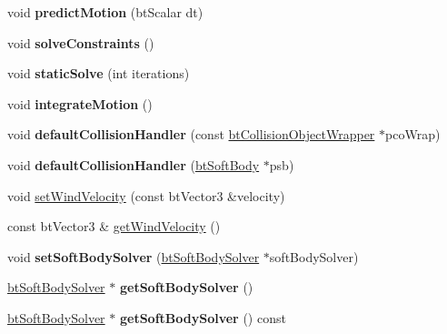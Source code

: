 \begin{DoxyCompactItemize}
\item 
\mbox{\label{classbtSoftBody_a37b6906ab9c76448b81254ae3748ef66}} 
void {\bfseries predict\+Motion} (bt\+Scalar dt)
\item 
\mbox{\label{classbtSoftBody_a98390e324d098502e6e9fb1ea2e52ab6}} 
void {\bfseries solve\+Constraints} ()
\item 
\mbox{\label{classbtSoftBody_a653fd3d83a1f7a8d0547b20e17af4483}} 
void {\bfseries static\+Solve} (int iterations)
\item 
\mbox{\label{classbtSoftBody_a21d3a56dff4c4999a2da272b712e616c}} 
void {\bfseries integrate\+Motion} ()
\item 
\mbox{\label{classbtSoftBody_a2efae0290d22ed8c05ef4540586283c5}} 
void {\bfseries default\+Collision\+Handler} (const \hyperlink{structbtCollisionObjectWrapper}{bt\+Collision\+Object\+Wrapper} $\ast$pco\+Wrap)
\item 
\mbox{\label{classbtSoftBody_a08d6032177bb1e5b8d89bc425c9b1d27}} 
void {\bfseries default\+Collision\+Handler} (\hyperlink{classbtSoftBody}{bt\+Soft\+Body} $\ast$psb)
\item 
void \hyperlink{classbtSoftBody_aee9ac69662731fa96ae2357522972ef9}{set\+Wind\+Velocity} (const bt\+Vector3 \&velocity)
\item 
const bt\+Vector3 \& \hyperlink{classbtSoftBody_a71de05c3c56952a4d76e09ca9ca9cce0}{get\+Wind\+Velocity} ()
\item 
\mbox{\label{classbtSoftBody_a4aebc3e54046a5748331e3e17b5d3efc}} 
void {\bfseries set\+Soft\+Body\+Solver} (\hyperlink{classbtSoftBodySolver}{bt\+Soft\+Body\+Solver} $\ast$soft\+Body\+Solver)
\item 
\mbox{\label{classbtSoftBody_a18b1a7b609c7a84d9f8cf0add29d180f}} 
\hyperlink{classbtSoftBodySolver}{bt\+Soft\+Body\+Solver} $\ast$ {\bfseries get\+Soft\+Body\+Solver} ()
\item 
\mbox{\label{classbtSoftBody_a9e4707a136596b16952228b002f8f799}} 
\hyperlink{classbtSoftBodySolver}{bt\+Soft\+Body\+Solver} $\ast$ {\bfseries get\+Soft\+Body\+Solver} () const

\end{DoxyCompactItemize}
